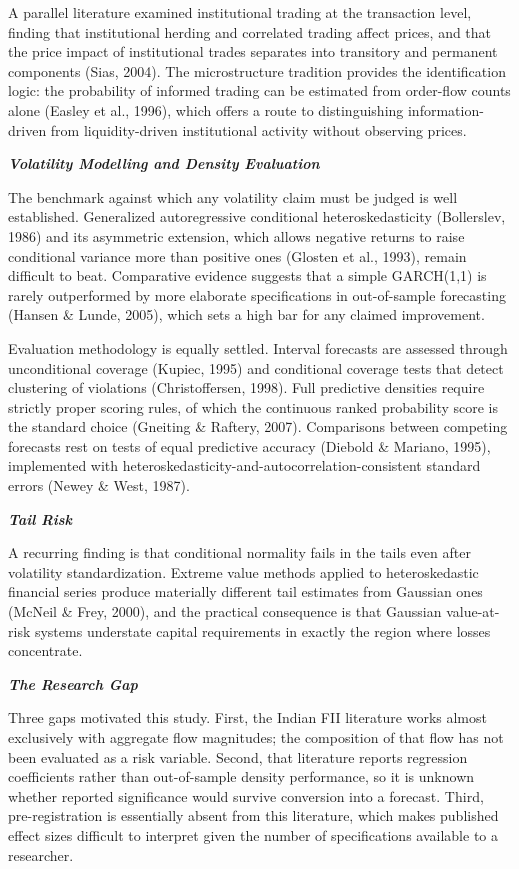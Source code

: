 \documentclass[12pt]{article}
\begin{document}
A parallel literature examined institutional trading at the transaction level,
finding that institutional herding and correlated trading affect prices, and
that the price impact of institutional trades separates into transitory and
permanent components (Sias, 2004). The microstructure tradition provides the
identification logic: the probability of informed trading can be estimated
from order-flow counts alone (Easley et al., 1996), which offers a route to
distinguishing information-driven from liquidity-driven institutional
activity without observing prices.

\textbf{\emph{Volatility Modelling and Density Evaluation}}

The benchmark against which any volatility claim must be judged is well
established. Generalized autoregressive conditional heteroskedasticity
(Bollerslev, 1986) and its asymmetric extension, which allows negative returns
to raise conditional variance more than positive ones (Glosten et al., 1993),
remain difficult to beat. Comparative evidence suggests that a simple
GARCH(1,1) is rarely outperformed by more elaborate specifications in
out-of-sample forecasting (Hansen \& Lunde, 2005), which sets a high bar for
any claimed improvement.

Evaluation methodology is equally settled. Interval forecasts are assessed
through unconditional coverage (Kupiec, 1995) and conditional coverage tests
that detect clustering of violations (Christoffersen, 1998). Full predictive
densities require strictly proper scoring rules, of which the continuous
ranked probability score is the standard choice (Gneiting \& Raftery, 2007).
Comparisons between competing forecasts rest on tests of equal predictive
accuracy (Diebold \& Mariano, 1995), implemented with
heteroskedasticity-and-autocorrelation-consistent standard errors (Newey \&
West, 1987).

\textbf{\emph{Tail Risk}}

A recurring finding is that conditional normality fails in the tails even
after volatility standardization. Extreme value methods applied to
heteroskedastic financial series produce materially different tail estimates
from Gaussian ones (McNeil \& Frey, 2000), and the practical consequence is
that Gaussian value-at-risk systems understate capital requirements in exactly
the region where losses concentrate.

\textbf{\emph{The Research Gap}}

Three gaps motivated this study. First, the Indian FII literature works almost
exclusively with aggregate flow magnitudes; the composition of that flow has
not been evaluated as a risk variable. Second, that literature reports
regression coefficients rather than out-of-sample density performance, so it
is unknown whether reported significance would survive conversion into a
forecast. Third, pre-registration is essentially absent from this literature,
which makes published effect sizes difficult to interpret given the number of
specifications available to a researcher.
\end{document}

